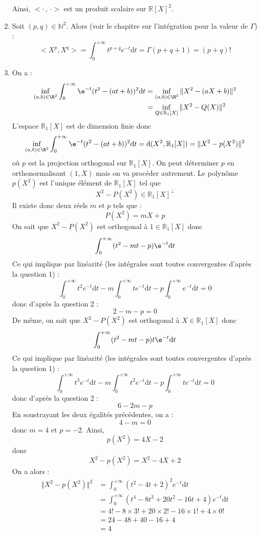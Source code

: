 \documentclass[a4paper,twoside,french,11pt]{VcCours}
\newcommand{\dt}{\text{d}t}
\begin{document}
\begin{enumerate}
\noindent Ainsi, $< \cdot \, , \, \cdot>$ est un produit scalaire sur $\mathbb{R}[X]^2$.
\item Soit $(p,q) \in \mathbb{N}^2$. Alors (voir le chapitre sur l'intégration pour la valeur de $\Gamma$) :
$$<X^p,X^q> = \int_0^{+ \infty} t^{p+q} e^{-t} \dt = \Gamma(p+q+1) = (p+q)!$$
\item  On a :
\begin{align*}
    \inf_{(a,b) \in \R^{2}} \int_{0}^{ + \infty} \e^{ - t}(t^{2} - (at + b))^{2} \dt&  =   \inf_{(a,b) \in \R^{2}} \Vert X^2-(aX+b)\Vert^2\\
    &  =   \inf_{Q \in \mathbb{R}_1[X]} \Vert X^2-Q(X) \Vert^2 
 \end{align*}
 L'espace $\mathbb{R}_1[X]$ est de dimension finie donc 
 $$  \inf_{(a,b) \in \R^{2}} \int_{0}^{ + \infty} \e^{ - t}(t^{2} - (at + b))^{2} \dt = \textrm{d}(X^2, \mathbb{R}_1[X]) = \Vert X^2-p(X^2) \Vert^2$$
 où $p$ est la projection orthogonal sur $\mathbb{R}_1[X]$. On peut déterminer $p$ en orthonormalisant $(1,X)$ mais on va procéder autrement. Le polynôme $p(X^2)$ est l'unique élément de $\mathbb{R}_1[X]$ tel que 
 $$ X^2-P(X^2) \in \mathbb{R}_1[X]^{\perp}$$
 Il existe donc deux réels $m$ et $p$ tels que :
 $$ P(X^2) = mX+p$$
 On sait que $X^2-P(X^2)$ est orthogonal à $1 \in \mathbb{R}_1[X]$ donc 
 $$ \int_{0}^{ + \infty} (t^2-mt-p) \e^{ - t} \dt$$
 Ce qui implique par linéarité (les intégrales sont toutes convergentes d'après la question 1) :
 $$ \int_{0}^{ + \infty}  t^2 e^{-t} \dt - m \int_{0}^{ + \infty}  t e^{-t} \dt -p \int_{0}^{ + \infty}   e^{-t} \dt =0$$
 donc d'après la question 2 :
 $$ 2-m-p=0$$
 De même, on sait que $X^2-P(X^2)$ est orthogonal à $X \in \mathbb{R}_1[X]$ donc 
 $$ \int_{0}^{ + \infty} (t^2-mt-p)t \e^{ - t} \dt$$
 Ce qui implique par linéarité (les intégrales sont toutes convergentes d'après la question 1) :
 $$ \int_{0}^{ + \infty}  t^3 e^{-t} \dt - m \int_{0}^{ + \infty}  t^2 e^{-t} \dt -p \int_{0}^{ + \infty}  t e^{-t} \dt =0$$
 donc d'après la question 2 :
 $$ 6-2m-p$$
 En soustrayant les deux égalités précédentes, on a :
 $$ 4-m=0$$
 donc $m=4$ et $p=-2$. Ainsi,
 $$ p(X^2) = 4X-2$$
 donc
 $$ X^2-p(X^2) = X^2-4X+2$$
 On a alors :
 \begin{align*}
 \Vert X^2-p(X^2) \Vert^2 & = \int_0^{+ \infty} (t^2-4t+2)^2 e^{-t} \dt \\
 & =  \int_0^{+ \infty} (t^4-8t^3+20t^2-16t+4) e^{-t} \dt \\
 & = 4!-8 \times 3!+20 \times 2!-16 \times 1! + 4 \times 0! \\
 & = 24 - 48+40-16+4 \\
 & = 4
 \end{align*}
\end{enumerate}
\end{document}
